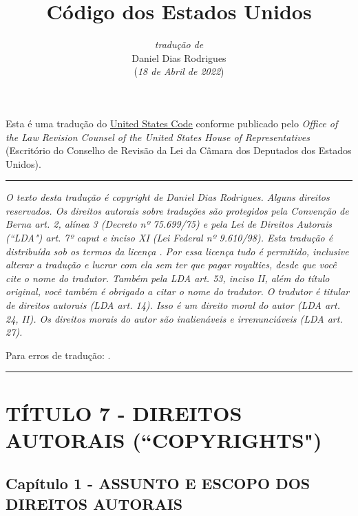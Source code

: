 \documentclass[a4paper, 12pt]{article}
\title{\textbf{Código dos Estados Unidos}}
\author{\textit{tradução de}\\Daniel Dias Rodrigues\\ (\textit{18 de Abril de 2022})}
\date{}
\begin{document}
\maketitle

Esta é uma tradução do \href{https://uscode.house.gov}{\underline{United States Code}} conforme publicado pelo \textit{Office of the Law Revision Counsel of the United States House of Representatives} (Escritório do Conselho de Revisão da Lei da Câmara dos Deputados dos Estados Unidos).

\begin{center}
\rule{7cm}{0.4pt}
\end{center}

\textit{O texto desta tradução é copyright  de Daniel Dias Rodrigues. Alguns direitos reservados. Os direitos autorais sobre traduções são protegidos pela Convenção de Berna art. 2, alínea 3 (Decreto nº 75.699/75) e pela Lei de Direitos Autorais (``LDA") art. 7º caput e inciso XI (Lei Federal nº 9.610/98). Esta tradução é distribuída sob os termos da licença \href{https://creativecommons.org/licenses/by/4.0/deed.pt_BR}{\underline{}}. Por essa licença tudo é permitido, inclusive alterar a tradução e lucrar com ela sem ter que pagar royalties, desde que você cite o nome do tradutor. Também pela LDA art. 53, inciso II, além do título original, você também é obrigado a citar o nome do tradutor. O tradutor é titular de direitos autorais (LDA art. 14). Isso é um direito moral do autor (LDA art. 24, II). Os direitos morais do autor são inalienáveis e irrenunciáveis (LDA art. 27).}

\vspace{5mm}

Para erros de tradução: \href{mailto:danieldiasr@gmail.com}{\underline{}}.

\begin{center}
\rule{7cm}{0.4pt}
\end{center}

\pagebreak

\tableofcontents

\pagebreak

\section{TÍTULO 7 - DIREITOS AUTORAIS (``COPYRIGHTS")}

\subsection{Capítulo 1 - ASSUNTO E ESCOPO DOS DIREITOS AUTORAIS}
\end{document}
